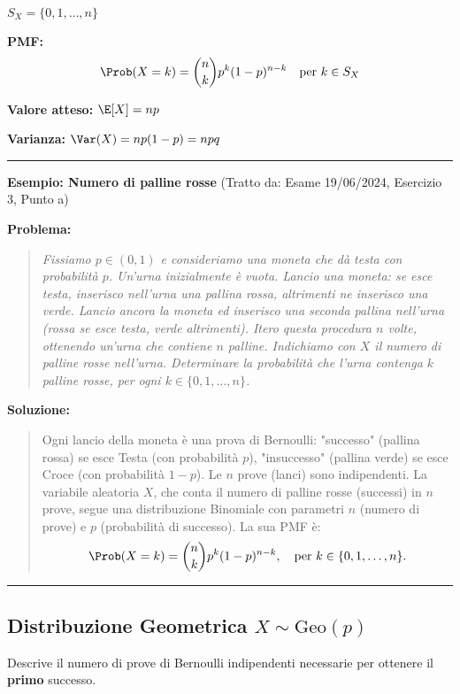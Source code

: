 $S_X = \{0, 1, \dots, n\}$

\textbf{PMF:} 
\[ \Prob(X=k) = \binom{n}{k} p^k (1-p)^{n-k} \quad \text{per } k \in S_X \]

\textbf{Valore atteso:} $\E[X] = np$

\textbf{Varianza:} $\Var(X) = np(1-p) = npq$

\vspace{1em}
\hrule
\par\vspace{0.5em}
\noindent\textbf{Esempio: Numero di palline rosse} (Tratto da: Esame 19/06/2024, Esercizio 3, Punto a)
\par\vspace{0.5em}
\noindent\textbf{Problema:}
\begin{quote}
\itshape
Fissiamo $p \in (0, 1)$ e consideriamo una moneta che dà testa con probabilità $p$. Un'urna inizialmente è vuota. Lancio una moneta: se esce testa, inserisco nell'urna una pallina rossa, altrimenti ne inserisco una verde. Lancio ancora la moneta ed inserisco una seconda pallina nell'urna (rossa se esce testa, verde altrimenti). Itero questa procedura $n$ volte, ottenendo un'urna che contiene $n$ palline. Indichiamo con $X$ il numero di palline rosse nell'urna.
Determinare la probabilità che l'urna contenga $k$ palline rosse, per ogni $k \in \{0, 1, \dots, n\}$.
\end{quote}
\noindent\textbf{Soluzione:}
\begin{quote}
Ogni lancio della moneta è una prova di Bernoulli: "successo" (pallina rossa) se esce Testa (con probabilità $p$), "insuccesso" (pallina verde) se esce Croce (con probabilità $1-p$). Le $n$ prove (lanci) sono indipendenti.
La variabile aleatoria $X$, che conta il numero di palline rosse (successi) in $n$ prove, segue una distribuzione Binomiale con parametri $n$ (numero di prove) e $p$ (probabilità di successo).
La sua PMF è:
\[ \Prob(X=k) = \binom{n}{k} p^k (1-p)^{n-k}, \quad \text{per } k \in \{0, 1, \dots, n\}. \]
\end{quote}
\vspace{0.5em}
\hrule
\vspace{1em}


\subsection{Distribuzione Geometrica \texorpdfstring{$X \sim \text{Geo}(p)$}{X ~ Geo(p)}}
Descrive il numero di prove di Bernoulli indipendenti necessarie per ottenere il \textbf{primo} successo.

